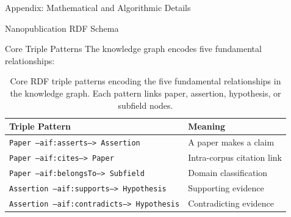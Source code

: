 \documentclass[
  ignorenonframetext,
]{beamer}
\begin{document}
\begin{frame}[fragile]{Appendix: Mathematical and Algorithmic Details
\label{sec:technical_appendix}}
\begin{block}{Nanopublication RDF Schema \label{sec:appendix_rdf}}
\begin{block}{Core Triple Patterns}
\protect{}\label{core-triple-patterns}
The knowledge graph encodes five fundamental relationships:

\begin{table}[htbp]
\centering
\caption{Core RDF triple patterns encoding the five fundamental relationships in the knowledge graph. Each pattern links paper, assertion, hypothesis, or subfield nodes.}
\label{tab:core_triple_patterns}
\begin{tabular}{ll}
\toprule
\textbf{Triple Pattern} & \textbf{Meaning} \\
\midrule
\texttt{Paper --aif:asserts--> Assertion} & A paper makes a claim \\
\texttt{Paper --aif:cites--> Paper} & Intra-corpus citation link \\
\texttt{Paper --aif:belongsTo--> Subfield} & Domain classification \\
\texttt{Assertion --aif:supports--> Hypothesis} & Supporting evidence \\
\texttt{Assertion --aif:contradicts--> Hypothesis} & Contradicting evidence \\
\bottomrule
\end{tabular}
\end{table}
\end{block}
\end{block}
\end{frame}
\end{document}
